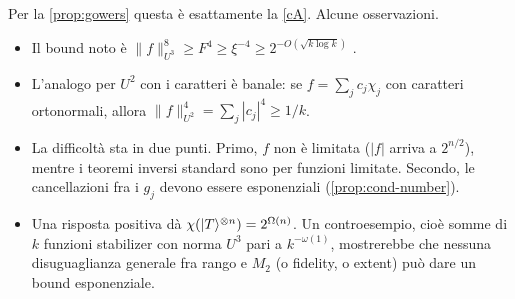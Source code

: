 \noindent Per la \cref{prop:gowers} questa è esattamente la \ref{cA}. Alcune osservazioni.
\begin{itemize}[leftmargin=1.5em]
\item Il bound noto è $\|f\|_{U^3}^8\ge F^4\ge\xi^{-4}\ge2^{-O(\sqrt{k\log k})}$ \cite{SL26}.
\item L'analogo per $U^2$ con i caratteri è banale: se $f=\sum_jc_j\chi_j$ con caratteri ortonormali, allora $\|f\|_{U^2}^4=\sum_j|c_j|^4\ge1/k$.
\item La difficoltà sta in due punti. Primo, $f$ non è limitata ($|f|$ arriva a $2^{n/2}$), mentre i teoremi inversi standard sono per funzioni limitate. Secondo, le cancellazioni fra i $g_j$ devono essere esponenziali (\cref{prop:cond-number}).
\item Una risposta positiva dà $\chi(\lvert T\rangle^{\otimes n})=2^{\Omega(n)}$. Un controesempio, cioè somme di $k$ funzioni stabilizer con norma $U^3$ pari a $k^{-\omega(1)}$, mostrerebbe che nessuna disuguaglianza generale fra rango e $M_2$ (o fidelity, o extent) può dare un bound esponenziale.
\end{itemize}
